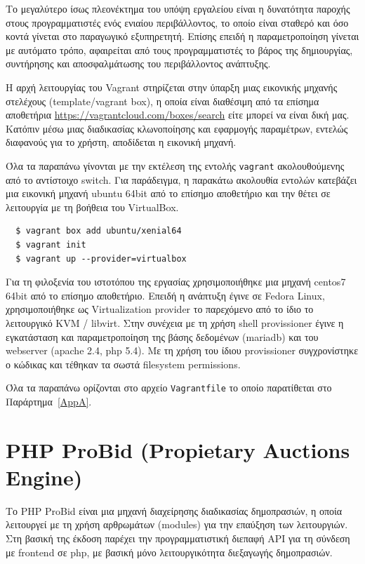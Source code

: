 \documentclass[12pt]{report}
\begin{document}
Το μεγαλύτερο ίσως πλεονέκτημα του υπόψη εργαλείου είναι η δυνατότητα παροχής στους προγραμματιστές ενός ενιαίου περιβάλλοντος, το οποίο είναι σταθερό και όσο κοντά γίνεται στο παραγωγικό εξυπηρετητή. Επίσης επειδή η παραμετροποίηση γίνεται με αυτόματο τρόπο, αφαιρείται από τους προγραμματιστές το βάρος της δημιουργίας, συντήρησης και αποσφαλμάτωσης του περιβάλλοντος ανάπτυξης.

Η αρχή λειτουργίας του \textlatin{Vagrant} στηρίζεται στην ύπαρξη μιας εικονικής μηχανής στελέχους (\textlatin{template/vagrant box}), η οποία είναι διαθέσιμη από τα επίσημα αποθετήρια \textlatin{\url{https://vagrantcloud.com/boxes/search}} είτε μπορεί να είναι δική μας. Κατόπιν μέσω μιας διαδικασίας κλωνοποίησης και εφαρμογής παραμέτρων, εντελώς διαφανούς για το χρήστη, αποδίδεται η εικονική μηχανή.

Όλα τα παραπάνω γίνονται με την εκτέλεση της εντολής \textlatin{\texttt{vagrant}} ακολουθούμενης από το αντίστοιχο \textlatin{switch}. Για παράδειγμα, η παρακάτω ακολουθία εντολών κατεβάζει μια εικονική μηχανή \textlatin{ubuntu 64bit} από το επίσημο αποθετήριο και την θέτει σε λειτουργία με τη βοήθεια του \textlatin{VirtualBox}.
\begin{Verbatim}
  $ vagrant box add ubuntu/xenial64
  $ vagrant init
  $ vagrant up --provider=virtualbox
\end{Verbatim}
Για τη φιλοξενία του ιστοτόπου της εργασίας χρησιμοποιήθηκε μια μηχανή \textlatin{centos7 64bit} από το επίσημο αποθετήριο. Επειδή η ανάπτυξη έγινε σε \textlatin{Fedora Linux}, χρησιμοποιήθηκε ως \textlatin{Virtualization provider} το παρεχόμενο από το ίδιο το λειτουργικό \textlatin{KVM / libvirt}. Στην συνέχεια με τη χρήση \textlatin{shell provissioner} έγινε η εγκατάσταση και παραμετροποίηση της βάσης δεδομένων (\textlatin{mariadb}) και του \textlatin{webserver (apache 2.4, php 5.4)}. Με τη χρήση του ίδιου \textlatin{provissioner} συγχρονίστηκε ο κώδικας και τέθηκαν τα σωστά \textlatin{filesystem permissions}.

Όλα τα παραπάνω ορίζονται στο αρχείο \textlatin{\texttt{Vagrantfile}} το οποίο παρατίθεται στο Παράρτημα~\ref{AppA}.

\section{\textlatin{PHP ProBid (Propietary Auctions Engine)}}\label{phpprobid}
Το \textlatin{PHP ProBid} είναι μια μηχανή διαχείρησης διαδικασίας δημοπρασιών, η οποία λειτουργεί με τη χρήση αρθρωμάτων (\textlatin{modules}) για την επαύξηση των λειτουργιών. Στη βασική της έκδοση παρέχει την προγραμματιστική διεπαφή \textlatin{API} για τη σύνδεση με \textlatin{frontend} σε \textlatin{php}, με βασική μόνο λειτουργικότητα διεξαγωγής δημοπρασιών.
\end{document}
